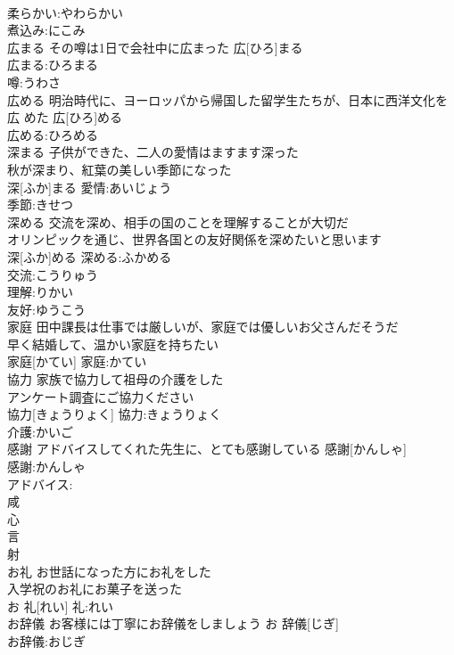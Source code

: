 \documentclass[8pt]{extreport}
\begin{document}
\begin{CJK}{UTF8}{min}
\\	柔らかい:やわらかい
\\	煮込み:にこみ
\\	広まる	その噂は1日で会社中に広まった	広[ひろ]まる	
\\	広まる:ひろまる
\\	噂:うわさ
\\	広める	明治時代に、ヨーロッパから帰国した留学生たちが、日本に西洋文化を広 めた	広[ひろ]める	
\\	広める:ひろめる
\\	深まる	子供ができた、二人の愛情はますます深った 
\\	秋が深まり、紅葉の美しい季節になった 
\\	深[ふか]まる			愛情:あいじょう
\\	季節:きせつ
\\	深める	交流を深め、相手の国のことを理解することが大切だ 
\\	オリンピックを通じ、世界各国との友好関係を深めたいと思います 
\\	深[ふか]める			深める:ふかめる
\\	交流:こうりゅう
\\	理解:りかい
\\	友好:ゆうこう
\\	家庭	田中課長は仕事では厳しいが、家庭では優しいお父さんだそうだ 
\\	早く結婚して、温かい家庭を持ちたい 
\\	家庭[かてい]			家庭:かてい
\\	協力	家族で協力して祖母の介護をした 
\\	アンケート調査にご協力ください 
\\	協力[きょうりょく]			協力:きょうりょく
\\	介護:かいご
\\	感謝	アドバイスしてくれた先生に、とても感謝している	感謝[かんしゃ]	
\\	感謝:かんしゃ
\\	アドバイス:
\\	咸 
\\	心 
\\	言 
\\	射 
\\	お礼	お世話になった方にお礼をした 
\\	入学祝のお礼にお菓子を送った 
\\	お 礼[れい]			礼:れい
\\	お辞儀	お客様には丁寧にお辞儀をしましょう	お 辞儀[じぎ]	
\\	お辞儀:おじぎ

\end{CJK}
\end{document}
